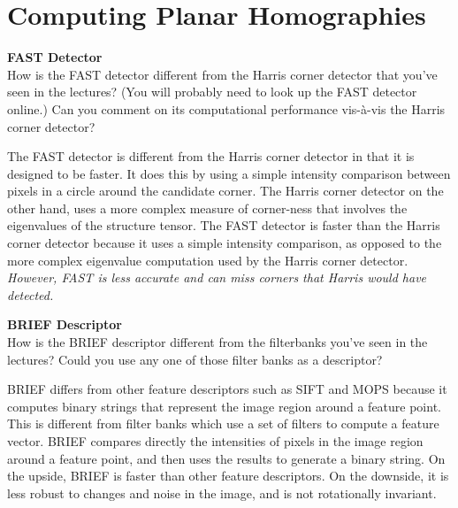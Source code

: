 \section{Computing Planar Homographies}

\begin{problem}[1]
  \textbf{FAST Detector} \\
  How is the FAST detector different from the Harris corner detector
  that you’ve seen in the lectures?
  (You will probably need to look up the FAST detector online.)
  Can you comment on its computational performance vis-\`a-vis
  the Harris corner detector?

  \begin{answer}
    The FAST detector is different from the Harris corner detector
    in that it is designed to be faster. It does this by using
    a simple intensity comparison between pixels in a circle
    around the candidate corner. The Harris corner detector
    on the other hand, uses a more complex measure of corner-ness
    that involves the eigenvalues of the structure tensor.
    The FAST detector is faster than the Harris corner detector
    because it uses a simple intensity comparison, as opposed to
    the more complex eigenvalue computation used by the Harris
    corner detector.
    \emph{
      However, FAST is less accurate and can miss corners that
      Harris would have detected.
    }
  \end{answer}
\end{problem}

\begin{problem}
  \textbf{BRIEF Descriptor} \\
  How is the BRIEF descriptor different from the filterbanks
  you’ve seen in the lectures?
  Could you use any one of those filter banks as a descriptor?

  \begin{answer}
    BRIEF differs from other feature descriptors such as SIFT and MOPS
    because it computes binary strings that represent the image region
    around a feature point. This is different from filter banks
    which use a set of filters to compute a feature vector.
    BRIEF compares directly the intensities of pixels in the image
    region around a feature point, and then uses the results to
    generate a binary string.
    On the upside, BRIEF is faster than other feature descriptors.
    On the downside, it is less robust to changes and noise in the image,
    and is not rotationally invariant.
  \end{answer}
\end{problem}

